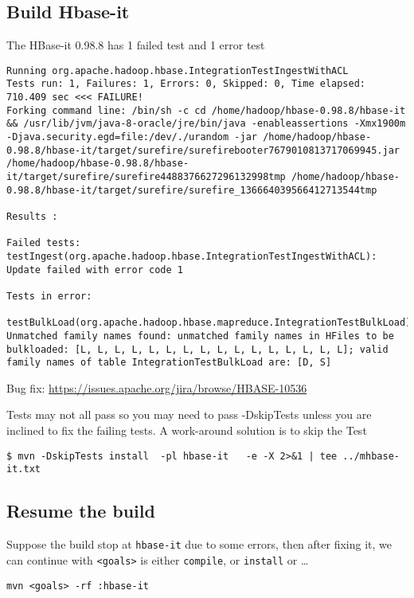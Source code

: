 \subsection{Build Hbase-it}
\label{sec:Hbase-it-test}

The HBase-it 0.98.8 has 1 failed test and 1 error test
\begin{verbatim}
Running org.apache.hadoop.hbase.IntegrationTestIngestWithACL
Tests run: 1, Failures: 1, Errors: 0, Skipped: 0, Time elapsed: 710.409 sec <<< FAILURE!
Forking command line: /bin/sh -c cd /home/hadoop/hbase-0.98.8/hbase-it && /usr/lib/jvm/java-8-oracle/jre/bin/java -enableassertions -Xmx1900m -Djava.security.egd=file:/dev/./urandom -jar /home/hadoop/hbase-0.98.8/hbase-it/target/surefire/surefirebooter7679010813717069945.jar /home/hadoop/hbase-0.98.8/hbase-it/target/surefire/surefire4488376627296132998tmp /home/hadoop/hbase-0.98.8/hbase-it/target/surefire/surefire_136664039566412713544tmp

Results :

Failed tests:   testIngest(org.apache.hadoop.hbase.IntegrationTestIngestWithACL): Update failed with error code 1

Tests in error: 
  testBulkLoad(org.apache.hadoop.hbase.mapreduce.IntegrationTestBulkLoad): Unmatched family names found: unmatched family names in HFiles to be bulkloaded: [L, L, L, L, L, L, L, L, L, L, L, L, L, L, L, L]; valid family names of table IntegrationTestBulkLoad are: [D, S]

\end{verbatim}

Bug fix: \url{https://issues.apache.org/jira/browse/HBASE-10536}

Tests may not all pass so you may need to pass -DskipTests unless you are
inclined to fix the failing tests. A work-around solution is to skip the Test
\begin{verbatim}
$ mvn -DskipTests install  -pl hbase-it   -e -X 2>&1 | tee ../mhbase-it.txt
\end{verbatim}

\subsection{Resume the build}


Suppose the build stop at \verb!hbase-it! due to some errors, then after fixing
it, we can continue with \verb!<goals>! is either \verb!compile!, or
\verb!install! or \ldots
\begin{verbatim}
mvn <goals> -rf :hbase-it
\end{verbatim}

